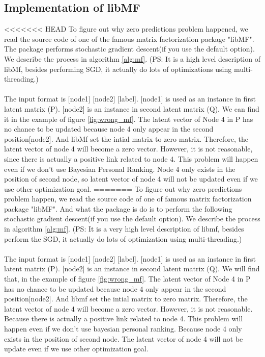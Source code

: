\documentclass[12pt]{article}
\begin{document}
\subsection {Implementation of libMF}
<<<<<<< HEAD
To figure out why zero predictions problem happened, we read the source code of one of the famous matrix factorization package "libMF". The package performs stochastic gradient descent(if you use the default option). We describe the process in algorithm \ref{alg:mf}. (PS: It is a high level description of libMf, besides performing SGD, it actually do lots of optimizations using multi-threading.)
\\
\\
The input format is [node1] [node2] [label]. [node1] is used as an instance in first latent matrix (P). [node2] is an instance in second latent matrix (Q). We can find it in the example of figure \ref{fig:wrong_mf}. The latent vector of Node 4 in P has no chance to be updated because node 4 only appear in the second position[node2]. And libMf set the intial matrix to zero matrix. Therefore, the latent vector of node 4 will become a zero vector. However, it is not reasonable, since there is actually a positive link related to node 4. This problem will happen even if we don't use Bayesian Personal Ranking. Node 4 only exists in the position of second node, so latent vector of node 4 will not be updated even if we use other optimization goal.
=======
To figure out why zero predictions problem happen, we read the source code of one of famous matrix factorization package "libMF". And what the package is do is to perform the following stochastic gradient descent(if you use the default option). We describe the process in algorithm \ref{alg:mf}. (PS: It is a very high level description of libmf, besides perform the SGD, it actually do lots of optimization using multi-threading.)
\\
\\
The input format is [node1] [node2] [label]. [node1] is used as an instance in first latent matrix (P). [node2] is an instance in second latent matrix (Q). We will find that, in the example of figure \ref{fig:wrong_mf}. The latent vector of Node 4 in P has no chance to be updated because node 4 only appear in the second position[node2]. And libmf set the intial matrix to zero matrix. Therefore, the latent vector of node 4 will become a zero vector. However, it is not reasonable. Because there is actually a positive link related to node 4. This problem will happen even if we don't use bayesian personal ranking. Because node 4 only exists in the position of second node. The latent vector of node 4 will not be update even if we use other optimization goal.
\end{document}
